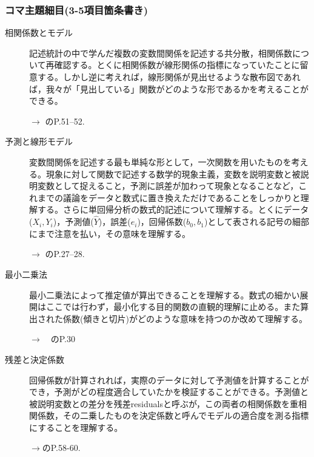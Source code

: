 \subsubsection{コマ主題細目(3-5項目箇条書き)}
\begin{description}
	\item[相関係数とモデル]記述統計の中で学んだ複数の変数間関係を記述する共分散，相関係数について再確認する。とくに相関係数が線形関係の指標になっていたことに留意する。しかし逆に考えれば，線形関係が見出せるような散布図であれば，我々が「見出している」関数がどのような形であるかを考えることができる。
	      \begin{flushright}
		      $\to$ \textcite{kosugi2018}のP.51--52.
	      \end{flushright}

	\item[予測と線形モデル]変数間関係を記述する最も単純な形として，一次関数を用いたものを考える。現象に対して関数で記述する数学的現象主義，変数を説明変数と被説明変数として捉えること，予測に誤差が加わって現象となることなど，これまでの議論をデータと数式に置き換えただけであることをしっかりと理解する。さらに単回帰分析の数式的記述について理解する。とくにデータ($X_i,Y_i$)，予測値($\hat{Y}$)，誤差($e_i$)，回帰係数($b_0,b_1$)として表される記号の細部にまで注意を払い，その意味を理解する。
	      \begin{flushright}
		      $\to$ \textcite{Toyoda201706}のP.27--28.
	      \end{flushright}

	\item[最小二乗法]最小二乗法によって推定値が算出できることを理解する。数式の細かい展開はここでは行わず，最小化する目的関数の直観的理解に止める。また算出された係数(傾きと切片)がどのような意味を持つのか改めて理解する。
	      \begin{flushright}
		      $\to$　\textcite{Toyoda201706}のP.30
	      \end{flushright}

	\item[残差と決定係数]回帰係数が計算されれば，実際のデータに対して予測値を計算することができ，予測がどの程度適合していたかを検証することができる。予測値と被説明変数との差分を残差residualsと呼ぶが，この両者の相関係数を重相関係数，その二乗したものを決定係数と呼んでモデルの適合度を測る指標にすることを理解する。
	      \begin{flushright}
		      $\to$\textcite{Nojima201903}のP.58-60.
	      \end{flushright}

\end{description}
